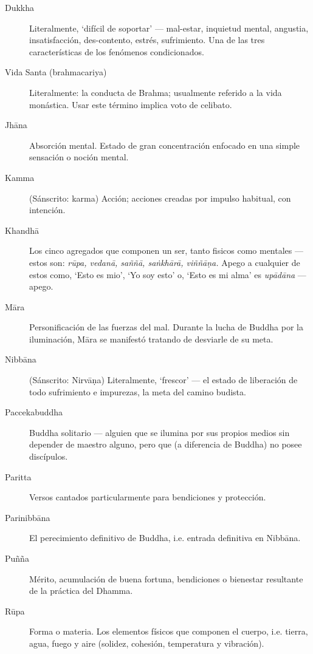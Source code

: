 \begin{description}
\item[Dukkha] Literalmente, ‘difícil de soportar’ --- mal-estar, inquietud mental, angustia, insatisfacción, des-contento, estrés, sufrimiento. Una de las tres características de los fenómenos condicionados.


\item[Vida Santa (brahmacariya)] Literalmente: la conducta de Brahma; usualmente referido a la vida monástica. Usar este término implica voto de celibato.

\item[Jhāna] Absorción mental. Estado de gran concentración enfocado en una simple sensación o noción mental.

\item[Kamma] (Sánscrito: karma) Acción; acciones creadas por impulso habitual, con intención.

\item[Khandhā] Los cinco agregados que componen un ser, tanto fisicos como mentales ---
  estos son: \emph{rūpa, vedanā, saññā, saṅkhārā, viññāṇa.} Apego a cualquier de estos como, ‘Esto es mio’, ‘Yo soy esto’ o, ‘Esto es mi alma’ es
  \emph{upādāna} --- apego.

\item[Māra] Personificación de las fuerzas del mal. Durante la lucha de Buddha por la iluminación, Māra se manifestó tratando de desviarle de su meta.

\item[Nibbāna] (Sánscrito: Nirvāṇa) Literalmente, ‘frescor’ --- el estado de liberación de todo sufrimiento e impurezas, la meta del camino budista.

\item[Paccekabuddha] Buddha solitario --- alguien que se ilumina por sus propios medios sin depender de maestro alguno, pero que (a diferencia de Buddha) no posee discípulos.

\item[Paritta] Versos cantados particularmente para bendiciones y protección.

\item[Parinibbāna] El perecimiento definitivo de Buddha, i.e. entrada definitiva en 
  Nibbāna.

\item[Puñña] Mérito, acumulación de buena fortuna, bendiciones o bienestar resultante de la práctica del Dhamma.

\item[Rūpa] Forma o materia. Los elementos físicos que componen el cuerpo,
  i.e. tierra, agua, fuego y aire (solidez, cohesión, temperatura y
  vibración).


\end{description}
